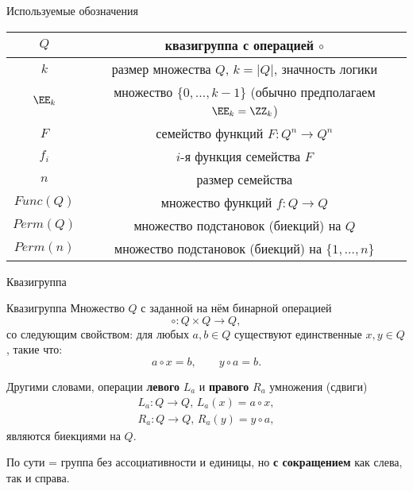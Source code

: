 \begin{frame}{Используемые обозначения}
    \begin{table}
        \begin{center}
            \begin{tabular}{|c|c|}
                \hline
                $Q$ &квазигруппа с операцией $\circ$ \\
                \hline 
                $k$ & размер множества $Q$, $k = \lvert Q \rvert$, значность логики \\
                \hline
                $\EE_k$ & множество $\{0, \ldots, k-1 \}$ (обычно предполагаем $\EE_k = \ZZ_k$) \\
                \hline
                $F$ & семейство функций $F \colon Q^n \to Q^n$ \\
                \hline 
                $f_i$ & $i$-я функция семейства $F$ \\
                \hline
                $n$ & размер семейства \\
                \hline
                $Func(Q)$ & множество функций $f \colon Q \to Q$ \\
                \hline 
                $Perm(Q)$ & множество подстановок (биекций) на $Q$ \\
                \hline
                $Perm(n)$ & множество подстановок (биекций) на $\{1, \ldots, n\}$ \\
                \hline
            \end{tabular}
        \end{center}
    \end{table}
\end{frame}


\begin{frame}{Квазигруппа}
    \begin{block}{Квазигруппа}
        Множество $Q$ с заданной на нём бинарной операцией
        \[
          \circ \colon Q \times Q \to Q, 
        \]
        со следующим свойством: для любых $a, b \in Q$ существуют единственные $x, y \in Q$, такие что:
        \[
          a \circ x = b, \qquad y \circ a = b.
        \]
    \end{block}

    \pause
    Другими словами, операции \textbf{левого} $L_a$ и \textbf{правого} $R_a$ умножения (сдвиги)
    \begin{gather*}
        L_a \colon Q \to Q,\, L_a(x) = a \circ x, \\
        R_a \colon Q \to Q,\, R_a(y) = y \circ a,
    \end{gather*}
    являются биекциями на $Q$.
    
    \pause 
    По сути = группа без ассоциативности и единицы, но \textbf{с сокращением} как слева, так и справа.
\end{frame}


